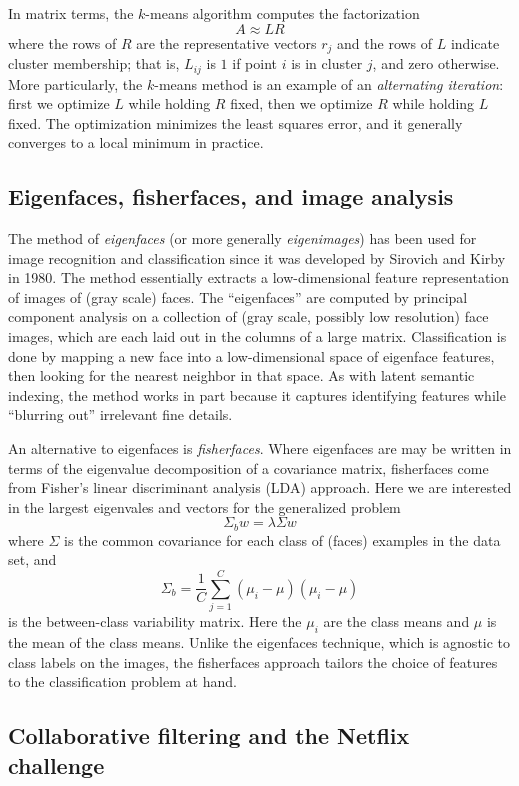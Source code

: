 \documentclass[12pt, leqno]{article} %
\begin{document}
In matrix terms, the $k$-means algorithm computes the factorization
\[
  A \approx L R
\]
where the rows of $R$ are the representative vectors $r_j$ and the
rows of $L$ indicate cluster membership; that is, $L_{ij}$ is $1$ if
point $i$ is in cluster $j$, and zero otherwise.  More particularly,
the $k$-means method is an example of an {\em alternating iteration}:
first we optimize $L$ while holding $R$ fixed, then we optimize $R$
while holding $L$ fixed.  The optimization minimizes the least squares
error, and it generally converges to a local minimum in practice.

\subsection{Eigenfaces, fisherfaces, and image analysis}

The method of {\em eigenfaces} (or more generally {\em eigenimages})
has been used for image recognition and classification since 
it was developed by Sirovich and Kirby in 1980.  The method
essentially extracts a low-dimensional feature representation of
images of (gray scale) faces.  The ``eigenfaces'' are computed by
principal component analysis on a collection of (gray scale, possibly
low resolution) face images, which are each laid out in the columns of
a large matrix.  Classification is done by mapping a new face into a
low-dimensional space of eigenface features, then looking for the
nearest neighbor in that space.  As with latent semantic indexing,
the method works in part because it captures identifying
features while ``blurring out'' irrelevant fine details.

An alternative to eigenfaces is {\em fisherfaces}.  Where eigenfaces
are may be written in terms of the eigenvalue decomposition of a
covariance matrix, fisherfaces come from Fisher's linear discriminant
analysis (LDA) approach.  Here we are interested in the largest
eigenvales and vectors for the generalized problem
\[
  \Sigma_b w = \lambda \Sigma w
\]
where $\Sigma$ is the common covariance for each class of (faces) examples
in the data set, and
\[
  \Sigma_b = \frac{1}{C} \sum_{j=1}^C (\mu_i-\mu) (\mu_i-\mu)
\]
is the between-class variability matrix.  Here the $\mu_i$ are the
class means and $\mu$ is the mean of the class means.  Unlike the
eigenfaces technique, which is agnostic to class labels on the images,
the fisherfaces approach tailors the choice of features to the
classification problem at hand.

\subsection{Collaborative filtering and the Netflix challenge}
\end{document}
